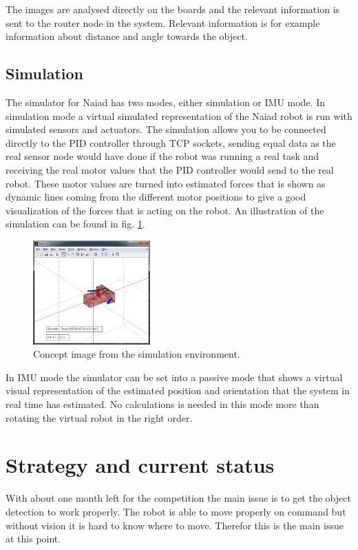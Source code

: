 \documentclass[twoside,12pt]{article}
\begin{document}
\begin{multicols*}{2}
The images are analysed directly on the boards and the relevant information is sent to the router node in the system. Relevant information is for example information about distance and angle towards the object. 
\subsection{Simulation}
The simulator for Naiad has two modes, either simulation or IMU mode. In simulation mode a virtual simulated representation of the Naiad robot is run with simulated sensors and actuators. The simulation allows you to be connected directly to the PID controller through TCP sockets, sending equal data as the real sensor node would have done if the robot was running a real task and receiving the real motor values that the PID controller would send to the real robot. These motor values are turned into estimated forces that is shown as dynamic lines coming from the different motor positions to give a good visualization of the forces that is acting on the robot. An illustration of the simulation can be found in fig. \ref{simulation}.
\begin{figure}[H]
\begin{center}
\includegraphics[width=0.4\textwidth]{./images/simforward.png}
\caption{Concept image from the simulation environment.}
\label{simulation}
\end{center}
\end{figure}
In IMU mode the simulator can be set into a passive mode that shows a virtual visual representation
of the estimated position and orientation that the system in real time has estimated. No calculations
is needed in this mode more than rotating the virtual robot in the right order.
\section{Strategy and current status}
\label{Future}
With about one month left for the competition the main issue is to get the object detection to work properly. The robot is able to move properly on command but without vision it is hard to know where to move. Therefor this is the main issue at this point. 


\end{multicols*}
\end{document}
